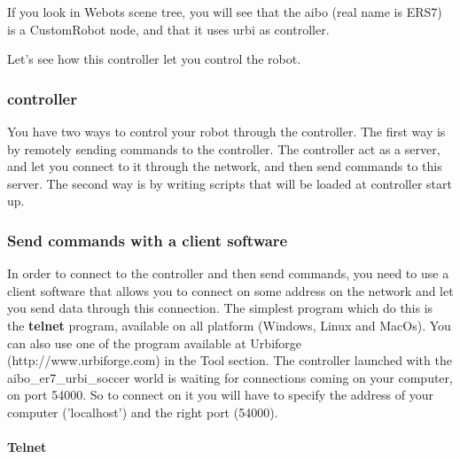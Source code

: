 If you look in Webots scene tree, you will see that the aibo (real
name is ERS7) is a CustomRobot node, and that it uses urbi as
controller.




Let's see how this controller let you control the robot.


\subsubsection{\urbi controller}
\label{webots.firstrun.urbicontroller}%

You have two ways to control your robot through the \urbi
controller. The first way is by remotely sending commands to the \urbi
controller. The \urbi controller act as a server, and let you connect
to it through the network, and then send \urbi commands to this server.
The second way is by writing \urbi scripts that will be loaded at
controller start up.


\subsubsection{Send commands with a client software}
\label{webots.firstrun.clientsoftware}%

In order to connect to the \urbi controller and then send commands, you
need to use a client software that allows you to connect on some
address on the network and let you send data through this connection.
The simplest program which do this is the \textbf{telnet} program,
available on all platform (Windows, Linux and MacOs). You can also use
one of the program available at Urbiforge (http://www.urbiforge.com)
in the Tool section.  The \urbi controller launched with the
aibo\_er7\_urbi\_soccer world is waiting for connections coming on
your computer, on port 54000. So to connect on it you will have to
specify the address of your computer ('localhost') and the right port
(54000).


\paragraph{Telnet}
\label{webots.firstrun.clientsoftware.telnet}%

